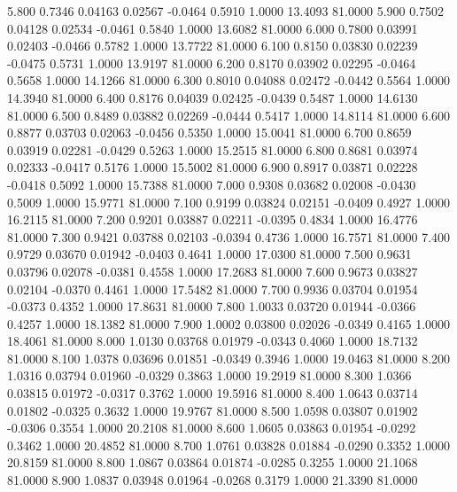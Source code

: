    5.800   0.7346   0.04163   0.02567  -0.0464   0.5910   1.0000  13.4093  81.0000
   5.900   0.7502   0.04128   0.02534  -0.0461   0.5840   1.0000  13.6082  81.0000
   6.000   0.7800   0.03991   0.02403  -0.0466   0.5782   1.0000  13.7722  81.0000
   6.100   0.8150   0.03830   0.02239  -0.0475   0.5731   1.0000  13.9197  81.0000
   6.200   0.8170   0.03902   0.02295  -0.0464   0.5658   1.0000  14.1266  81.0000
   6.300   0.8010   0.04088   0.02472  -0.0442   0.5564   1.0000  14.3940  81.0000
   6.400   0.8176   0.04039   0.02425  -0.0439   0.5487   1.0000  14.6130  81.0000
   6.500   0.8489   0.03882   0.02269  -0.0444   0.5417   1.0000  14.8114  81.0000
   6.600   0.8877   0.03703   0.02063  -0.0456   0.5350   1.0000  15.0041  81.0000
   6.700   0.8659   0.03919   0.02281  -0.0429   0.5263   1.0000  15.2515  81.0000
   6.800   0.8681   0.03974   0.02333  -0.0417   0.5176   1.0000  15.5002  81.0000
   6.900   0.8917   0.03871   0.02228  -0.0418   0.5092   1.0000  15.7388  81.0000
   7.000   0.9308   0.03682   0.02008  -0.0430   0.5009   1.0000  15.9771  81.0000
   7.100   0.9199   0.03824   0.02151  -0.0409   0.4927   1.0000  16.2115  81.0000
   7.200   0.9201   0.03887   0.02211  -0.0395   0.4834   1.0000  16.4776  81.0000
   7.300   0.9421   0.03788   0.02103  -0.0394   0.4736   1.0000  16.7571  81.0000
   7.400   0.9729   0.03670   0.01942  -0.0403   0.4641   1.0000  17.0300  81.0000
   7.500   0.9631   0.03796   0.02078  -0.0381   0.4558   1.0000  17.2683  81.0000
   7.600   0.9673   0.03827   0.02104  -0.0370   0.4461   1.0000  17.5482  81.0000
   7.700   0.9936   0.03704   0.01954  -0.0373   0.4352   1.0000  17.8631  81.0000
   7.800   1.0033   0.03720   0.01944  -0.0366   0.4257   1.0000  18.1382  81.0000
   7.900   1.0002   0.03800   0.02026  -0.0349   0.4165   1.0000  18.4061  81.0000
   8.000   1.0130   0.03768   0.01979  -0.0343   0.4060   1.0000  18.7132  81.0000
   8.100   1.0378   0.03696   0.01851  -0.0349   0.3946   1.0000  19.0463  81.0000
   8.200   1.0316   0.03794   0.01960  -0.0329   0.3863   1.0000  19.2919  81.0000
   8.300   1.0366   0.03815   0.01972  -0.0317   0.3762   1.0000  19.5916  81.0000
   8.400   1.0643   0.03714   0.01802  -0.0325   0.3632   1.0000  19.9767  81.0000
   8.500   1.0598   0.03807   0.01902  -0.0306   0.3554   1.0000  20.2108  81.0000
   8.600   1.0605   0.03863   0.01954  -0.0292   0.3462   1.0000  20.4852  81.0000
   8.700   1.0761   0.03828   0.01884  -0.0290   0.3352   1.0000  20.8159  81.0000
   8.800   1.0867   0.03864   0.01874  -0.0285   0.3255   1.0000  21.1068  81.0000
   8.900   1.0837   0.03948   0.01964  -0.0268   0.3179   1.0000  21.3390  81.0000
